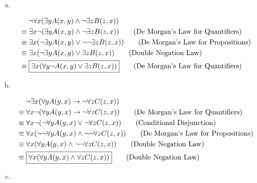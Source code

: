 \documentclass[answers]{exam}
\newenvironment{colored}[1][]{
    \bgroup\color{#1}
}{
\egroup\vspace{-0.8em}
}
\renewenvironment{solution}[1][]{\begin{answer}[#1]\begin{colored}[mySolColor]}{\end{colored}\end{answer}\vspace{1em}}
\begin{document}
\begin{solution}
    \begin{enumerate}[(a)]
        \item ~

        \vspace{-3\baselineskip}
        \begin{align}
            & \quad \; \neg \forall x (\exists y A(x,y) \land \neg \exists z B(z,x)) \notag\\
            & \equiv \exists x \neg (\exists y A(x,y) \land \neg \exists z B(z,x)) \tag{De Morgan's Law for Quantifiers}\\
            & \equiv \exists x (\neg\exists y A(x,y) \vee \neg \neg\exists z B(z,x)) \tag{De Morgan's Law for Propositions}\\
            & \equiv \exists x (\neg\exists y A(x,y) \vee \exists z B(z,x)) \tag{Double Negation Law}\\
            & \equiv \boxed{\exists x (\forall y \neg A(x,y) \vee \exists z B(z,x))} \tag{De Morgan's Law for Quantifiers}
        \end{align}

        \item ~

        \vspace{-3\baselineskip}
        \begin{align}
            & \quad\; \neg \exists x (\forall y A(y,x) \rightarrow \neg \forall z C(z,x)) \notag \\
            & \equiv \forall x \neg(\forall y A(y,x) \rightarrow \neg \forall z C(z,x)) \tag{De Morgan's Law for Quantifiers}\\
            & \equiv \forall x \neg(\neg\forall y A(y,x) \vee \neg \forall z C(z,x)) \tag{Conditional Disjunction}\\
            & \equiv \forall x (\neg\neg\forall y A(y,x) \wedge \neg\neg\forall z C(z,x)) \tag{De Morgan's Law for Propositions}\\
            & \equiv \forall x (\forall y A(y,x) \wedge \neg\neg\forall z C(z,x)) \tag{Double Negation Law}\\
            & \equiv \boxed{\forall x (\forall y A(y,x) \wedge \forall z C(z,x))} \tag{Double Negation Law}
        \end{align}

        \item ~


\end{enumerate}
\end{solution}
\end{document}
